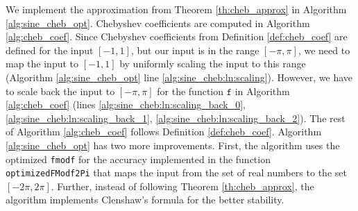 \documentclass[12pt]{article}
\begin{document}
We implement the approximation from Theorem \ref{th:cheb_approx} in Algorithm \ref{alg:sine_cheb_opt}.
Chebyshev coefficients are computed in Algorithm \ref{alg:cheb_coef}.
Since Chebyshev coefficients from Definition \ref{def:cheb_coef} are defined for the input $[-1, 1]$, but our input is in the range $[-\pi, \pi]$, we need to map the input to $[-1, 1]$ by uniformly scaling the input to this range (Algorithm \ref{alg:sine_cheb_opt} line \ref{alg:sine_cheb:ln:scaling}).
However, we have to scale back the input to $[-\pi, \pi]$ for the function $\texttt{f}$ in Algorithm \ref{alg:cheb_coef} (lines \ref{alg:sine_cheb:ln:scaling_back_0}, \ref{alg:sine_cheb:ln:scaling_back_1}, \ref{alg:sine_cheb:ln:scaling_back_2}).
The rest of Algorithm \ref{alg:cheb_coef} follows Definition \ref{def:cheb_coef}.
Algorithm \ref{alg:sine_cheb_opt} has two more improvements.
First, the algorithm uses the optimized \texttt{fmodf} for the accuracy implemented in the function \texttt{optimizedFModf2Pi} that maps the input from the set of real numbers to the set $[-2 \pi, 2 \pi]$.
Further, instead of following Theorem \ref{th:cheb_approx}, the algorithm implements Clenshaw's formula \cite[p~.237]{press2007numerical} for the better stability.






\end{document}
